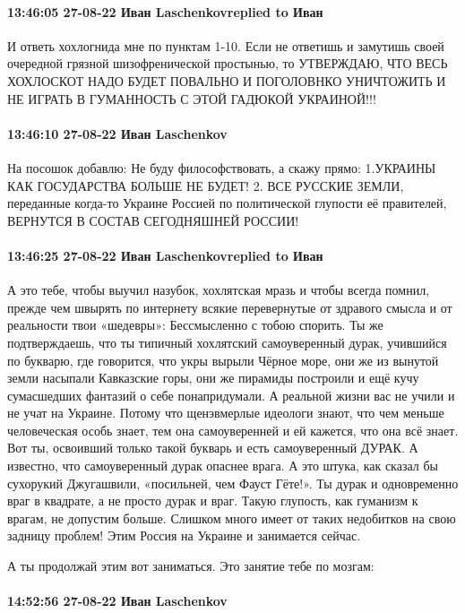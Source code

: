 \paragraph{13:46:05 27-08-22 Иван Laschenkovreplied to Иван}

И ответь хохлогнида мне по пунктам 1-10. Если не ответишь и замутишь своей очередной грязной шизофренической простынью, то УТВЕРЖДАЮ, ЧТО ВЕСЬ ХОХЛОСКОТ НАДО БУДЕТ ПОВАЛЬНО И ПОГОЛОВНКО УНИЧТОЖИТЬ И НЕ ИГРАТЬ В ГУМАННОСТЬ С ЭТОЙ ГАДЮКОЙ УКРАИНОЙ!!!

\paragraph{13:46:10 27-08-22 Иван Laschenkov}
На посошок добавлю:
Не буду философствовать, а скажу прямо:
1.УКРАИНЫ КАК ГОСУДАРСТВА БОЛЬШЕ НЕ БУДЕТ!
2. ВСЕ РУССКИЕ ЗЕМЛИ, переданные когда-то Украине Россией по политической глупости её правителей,
ВЕРНУТСЯ В СОСТАВ СЕГОДНЯШНЕЙ РОССИИ!

\paragraph{13:46:25 27-08-22 Иван Laschenkovreplied to Иван}

А это тебе, чтобы выучил назубок, хохлятская мразь и чтобы всегда помнил,
прежде чем швырять по интернету всякие перевернутые от здравого смысла и от
реальности твои «шедевры»: Бессмысленно с тобою спорить. Ты же подтверждаешь,
что ты типичный хохлятский самоуверенный дурак, учившийся по букварю, где
говорится, что укры вырыли Чёрное море, они же из вынутой земли насыпали
Кавказские горы, они же пирамиды построили и ещё кучу сумасшедших фантазий о
себе понапридумали. А реальной жизни вас не учили и не учат на Украине. Потому
что щенэвмерлые идеологи знают, что чем меньше человеческая особь знает, тем
она самоуверенней и ей кажется, что она всё знает. Вот ты, освоивший только
такой букварь и есть самоуверенный ДУРАК. А известно, что самоуверенный дурак
опаснее врага. А это штука, как сказал бы сухорукий Джугашвили, «посильней, чем
Фауст Гёте!». Ты дурак и одновременно враг в квадрате, а не просто дурак и
враг. Такую глупость, как гуманизм к врагам, не допустим больше. Слишком много
имеет от таких недобитков на свою задницу проблем! Этим Россия на Украине и
занимается сейчас.

А ты продолжай этим вот заниматься. Это занятие тебе по мозгам:


\paragraph{14:52:56 27-08-22 Иван Laschenkov}


